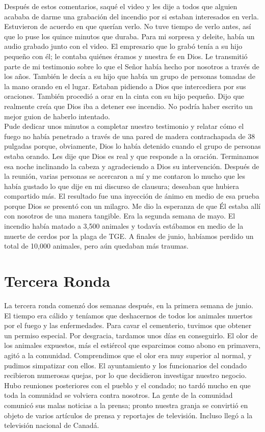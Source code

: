 \documentclass[twoside, 12pt]{book}
\begin{document}
Después de estos comentarios, saqué el video y les dije a todos que alguien acababa de darme una grabación del incendio por si estaban interesados en verla. Estuvieron de acuerdo en que querían verlo. No tuve tiempo de verlo antes, así que lo puse los quince minutos que duraba. Para mi sorpresa y deleite, había un audio grabado junto con el video. El empresario que lo grabó tenía a su hijo pequeño con él; le contaba quiénes éramos y nuestra fe en Dios. Le transmitió parte de mi testimonio sobre lo que el Señor había hecho por nosotros a través de los años. También le decía a su hijo que había un grupo de personas tomadas de la mano orando en el lugar. Estaban pidiendo a Dios que intercediera por sus oraciones. También procedió a orar en la cinta con su hijo pequeño. Dijo que realmente creía que Dios iba a detener ese incendio. No podría haber escrito un mejor guion de haberlo intentado.\\

Pude dedicar unos minutos a completar nuestro testimonio y relatar cómo el fuego no había penetrado a través de una pared de madera contrachapada de 38 pulgadas porque, obviamente, Dios lo había detenido cuando el grupo de personas estaba orando. Les dije que Dios es real y que responde a la oración. Terminamos esa noche inclinando la cabeza y agradeciendo a Dios su intervención. Después de la reunión, varias personas se acercaron a mí y me contaron lo mucho que les había gustado lo que dije en mi discurso de clausura; deseaban que hubiera compartido más. El resultado fue una inyección de ánimo en medio de esa prueba porque Dios se presentó con un milagro. Me dio la esperanza de que Él estaba allí con nosotros de una manera tangible. Era la segunda semana de mayo. El incendio había matado a 3,500 animales y todavía estábamos en medio de la muerte de cerdos por la plaga de TGE. A finales de junio, habíamos perdido un total de 10,000 animales, pero aún quedaban más traumas.\\

\section{Tercera Ronda}

La tercera ronda comenzó dos semanas después, en la primera semana de junio. El tiempo era cálido y teníamos que deshacernos de todos los animales muertos por el fuego y las enfermedades. Para cavar el cementerio, tuvimos que obtener un permiso especial. Por desgracia, tardamos unos días en conseguirlo. El olor de los animales expuestos, más el estiércol que esparcimos como abono en primavera, agitó a la comunidad. Comprendimos que el olor era muy superior al normal, y pudimos simpatizar con ellos. El ayuntamiento y los funcionarios del condado recibieron numerosas quejas, por lo que decidieron investigar nuestro negocio. Hubo reuniones posteriores con el pueblo y el condado; no tardó mucho en que toda la comunidad se volviera contra nosotros. La gente de la comunidad comunicó sus malas noticias a la prensa; pronto nuestra granja se convirtió en objeto de varios artículos de prensa y reportajes de televisión. Incluso llegó a la televisión nacional de Canadá.\\
\end{document}
